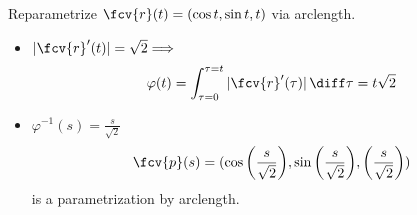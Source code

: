 \begin{frame}
\begin{example}
Reparametrize $\fcv{r}(t) = ( \cos{t}, \sin{t}, t)$ via arclength.

\begin{itemize}
\item<2-> $|\fcv{r}'(t)| = \sqrt{2} \Longrightarrow $
$$\varphi(t) = \int_{\tau=0}^{\tau=t}|\fcv{r}'(\tau)|\, \diff\tau =  t\sqrt{2}$$
\item<3-> $\varphi^{-1}(s) = \frac{s}{\sqrt{2}}$
\[
\fcv{p}(s) = ( \cos{\left( \frac{s}{\sqrt{2}} \right)}, \sin{\left( \frac{s}{\sqrt{2}} \right)}, \left( \frac{s}{\sqrt{2}} \right) )
\]
is a parametrization by arclength.
\end{itemize}
\end{example}
\end{frame}
